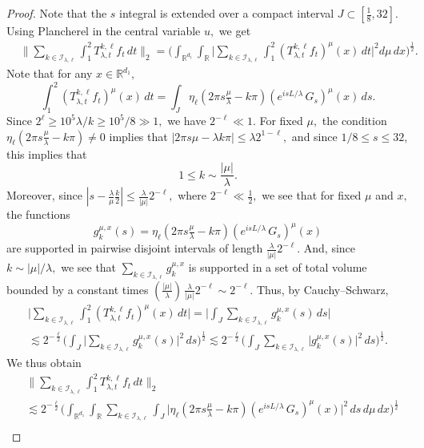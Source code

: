\documentclass[leqno]{amsart}
\theoremstyle{definition}
\theoremstyle{remark}
\numberwithin{equation}{section}
\newcommand{\R}{\mathbb{R}}
\newcommand\la{{\lambda}}
\begin{document}
\begin{proof}
Note that the $s$ integral is extended over a compact interval $J\subset [\frac 1 8, 32]$.
Using Plancherel  in the central variable $u,$ we get
\begin{align*}
&\Big\| \sum_{k\in\mathcal I_{\lambda,\ell}} 
\int_1^2 T^{k,\ell}_{\la,t}f_t \, dt \Big\|_2 
 =\Big( \int_{\R^{d_1}}\int_{\R} \Big| \sum_{k\in\mathcal I_{\lambda,\ell}} \int_1^2 (T^{k,\ell}_{\la,t}f_t)^\mu(x) \, dt \Big|^2 d\mu \, dx\Big)^{\frac{1}{2}} .
\end{align*} 
Note that for any $x\in \R^{d_1},$ 
\[
\int_1^2 (T^{k,\ell}_{\la,t}f_t)^\mu(x) \, dt = \int_J \eta_\ell( 2\pi s\tfrac{\mu}{\lambda}-k\pi) (e^{isL/\la} \, G_s)^\mu(x) \, ds.
\]
Since $2^\ell\ge 10^5 \la /k\ge 10^5/8\gg1,$ we have $2^{-\ell}\ll 1.$ For fixed $\mu,$ the condition $\eta_\ell(2\pi s\tfrac{\mu}{\lambda}-k\pi) \neq 0$ implies that $|2\pi s\mu-\la k\pi|\le \la 2^{1-\ell},$ and since $1/8\le s\le 32,$ this implies that 
$$
1\le k\sim \frac{|\mu|}\la.
$$
Moreover, since  $|s-\frac {\la} {\mu} \frac k 2 |\le \frac\la{|\mu|} 2^{-\ell},$ where $2^{-\ell}\ll \frac{1}{2},$ we see that for fixed $\mu$ and $x,$ the functions 
$$
g^{\mu,x}_k(s) =\eta_\ell(2\pi s\tfrac{\mu}{\lambda}-k\pi) (e^{isL/\la} \, G_s)^\mu(x)
$$
are  supported in pairwise disjoint intervals of length $\frac\la{|\mu|} 2^{-\ell}.$ And, since $k\sim |\mu|/\la,$ we see that
$\sum_{k\in\mathcal I_{\lambda,\ell}} g^{\mu,x}_k$ is supported in a set of total volume bounded by a constant times 
$(\frac{|\mu|}{\la})\, \frac\la{|\mu|} 2^{-\ell}\sim 2^{-\ell}.$ Thus, by Cauchy--Schwarz,
\begin{multline*}
 \big|\sum_{k\in\mathcal I_{\lambda,\ell}}\int_1^2(T^{k,\ell}_{\la,t}f_t)^\mu(x) \, dt\Big|
 =\Big| \int_J\sum_{k\in\mathcal I_{\lambda,\ell}}g^{\mu,x}_k(s) \, ds\Big|\\
 \lesssim 2^{-\frac \ell 2}\Big(\int_J \big|\sum_{k\in\mathcal I_{\lambda,\ell}}g^{\mu,x}_k(s)\big|^2 \, ds\Big)^{\frac 12}
 \lesssim 2^{-\frac \ell 2}\Big(\int_J \sum_{k\in\mathcal I_{\lambda,\ell}}\big| g^{\mu,x}_k(s)\big|^2 \, ds\Big)^{\frac 12}.
\end{multline*}
We thus obtain
\begin{align*}
&\Big\| \sum_{k\in\mathcal I_{\lambda,\ell}} 
\int_1^2 T^{k,\ell}_{\la,t}f_t \, dt \Big\|_2 \\
&\lesssim 2^{-\frac \ell 2}
\Big( \int_{\R^{d_1}}\int_{\R} \sum_{k\in\mathcal I_{\lambda,\ell}}  \int_J \Big|\eta_\ell(2\pi s\tfrac{\mu}{\lambda}-k\pi) (e^{isL/\la} \, G_s)^\mu(x) \Big|^2 \, ds \,d\mu \, dx\Big)^{\frac{1}{2}}\\

\end{align*}
\end{proof}
\end{document}
